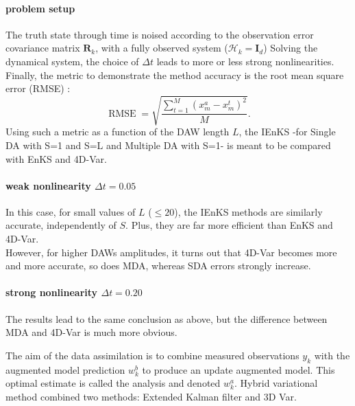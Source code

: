 \documentclass[a4,12pt]{article}
\numberwithin{equation}{section}
\begin{document}
\paragraph{problem setup}
The truth state through time is noised according to the observation error covariance matrix $\textbf{R}_k$, with a fully observed system ($\mathcal{H}_k = \textbf{I}_d$) 
Solving the dynamical system, the choice of $\Delta t$ leads to more or less strong nonlinearities. \\
Finally, the metric to demonstrate the method accuracy is the root mean square error (RMSE) :
$$\operatorname{RMSE}= \sqrt{\frac{\sum_{t=1}^M (x_{m}^{a} - x_{m}^{t})^2}{M}}.$$
Using such a metric as a function of the DAW length $L$, the IEnKS -for Single DA with S=1 and S=L and Multiple DA with S=1- is meant to be compared with EnKS and 4D-Var.

\paragraph{weak nonlinearity $\Delta t = 0.05$}
In this case, for small values of $L$ ($\leq 20$), the IEnKS methods are similarly accurate, independently of $S$. Plus, they are far more efficient than EnKS and 4D-Var. \\
However, for higher DAWs amplitudes, it turns out that 4D-Var becomes more and more accurate, so does MDA, whereas SDA errors strongly increase.

\paragraph{strong nonlinearity $\Delta t = 0.20$}
The results lead to the same conclusion as above, but the difference between MDA and 4D-Var is much more obvious.




The aim of the data assimilation is to combine measured observations $y_k$ with the augmented model prediction $w_k^b$ to produce an update augmented model. This optimal estimate is called the analysis and denoted $w_k^a$. Hybrid variational method combined two methods: Extended Kalman filter and 3D Var.
\end{document}
